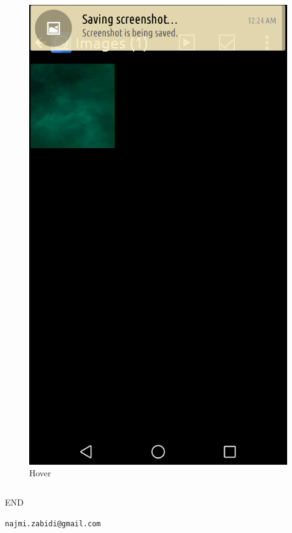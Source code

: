 \documentclass{beamer}
\begin{document}
{\begin{frame}
\begin{columns}[t]
 \begin{column}{5cm}
 \begin{figure}
 \includegraphics[scale=0.1]{hover}
   \caption{\tiny{Hover}}
 \end{figure}
 \end{column}

\end{columns}
 \end{frame}
}


\begin{frame}{END}

\begin{center}
\Large \texttt{najmi.zabidi@gmail.com}
\end{center}

\end{frame}
\end{document}
